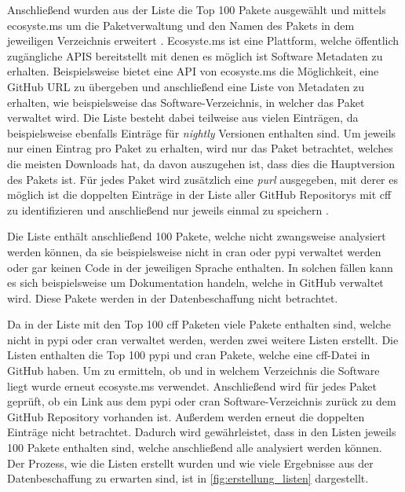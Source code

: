 Anschließend wurden aus der Liste die Top 100 Pakete ausgewählt und mittels ecosyste.ms um die Paketverwaltung und den Namen des Pakets in dem jeweiligen Verzeichnis erweitert \autocite{nesbitt_ecosystems_nodate}.
Ecosyste.ms ist eine Plattform, welche öffentlich zugängliche APIS bereitstellt mit denen es möglich ist Software Metadaten zu erhalten.
Beispielsweise bietet eine API von ecosyste.ms die Möglichkeit, eine GitHub URL zu übergeben und anschließend eine Liste von Metadaten zu erhalten, wie beispielsweise das Software-Verzeichnis, in welcher das Paket verwaltet wird.
Die Liste besteht dabei teilweise aus vielen Einträgen, da beispielsweise ebenfalls Einträge für \emph{nightly} Versionen enthalten sind.
Um jeweils nur einen Eintrag pro Paket zu erhalten, wird nur das Paket betrachtet, welches die meisten Downloads hat, da davon auszugehen ist, dass dies die Hauptversion des Pakets ist.
Für jedes Paket wird zusätzlich eine \emph{purl} ausgegeben, mit derer es möglich ist die doppelten Einträge in der Liste aller GitHub Repositorys mit \gls{cff} zu identifizieren und anschließend nur jeweils einmal zu speichern \autocites{noauthor_package-urlpurl-spec_2024}{nesbitt_ecosystems_nodate}.

Die Liste enthält anschließend 100 Pakete, welche nicht zwangsweise analysiert werden können, da sie beispielsweise nicht in \gls{cran} oder \gls{pypi} verwaltet werden oder gar keinen Code in der jeweiligen Sprache enthalten.
In solchen fällen kann es sich beispielsweise um Dokumentation handeln, welche in GitHub verwaltet wird.
Diese Pakete werden in der Datenbeschaffung nicht betrachtet.

Da in der Liste mit den Top 100 \gls{cff} Paketen viele Pakete enthalten sind, welche nicht in \gls{pypi} oder \gls{cran} verwaltet werden, werden zwei weitere Listen erstellt.
Die Listen enthalten die Top 100 \gls{pypi} und \gls{cran} Pakete, welche eine \gls{cff}-Datei in GitHub haben.
Um zu ermitteln, ob und in welchem Verzeichnis die Software liegt wurde erneut ecosyste.ms verwendet.
Anschließend wird für jedes Paket geprüft, ob ein Link aus dem \gls{pypi} oder \gls{cran} Software-Verzeichnis zurück zu dem GitHub Repository vorhanden ist.
Außerdem werden erneut die doppelten Einträge nicht betrachtet.
Dadurch wird gewährleistet, dass in den Listen jeweils 100 Pakete enthalten sind, welche anschließend alle analysiert werden können.
Der Prozess, wie die Listen erstellt wurden und wie viele Ergebnisse aus der Datenbeschaffung zu erwarten sind, ist in \autoref{fig:erstellung_listen} dargestellt.

